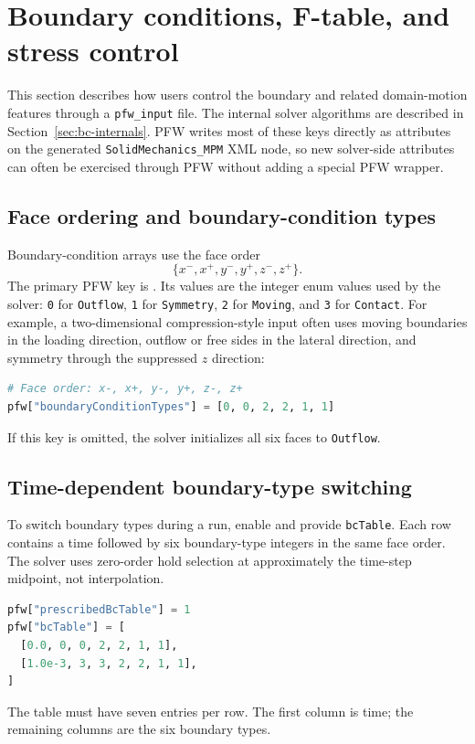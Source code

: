 \section{Boundary conditions, F-table, and stress control}
\label{sec:pfw-boundary-controls}

This section describes how users control the boundary and related domain-motion features through a \texttt{pfw\_input} file.  The internal solver algorithms are described in Section~\ref{sec:bc-internals}.  PFW writes most of these keys directly as attributes on the generated \texttt{SolidMechanics\_MPM} XML node, so new solver-side attributes can often be exercised through PFW without adding a special PFW wrapper.

\subsection{Face ordering and boundary-condition types}

Boundary-condition arrays use the face order
\begin{equation}
  \{x^-,x^+,y^-,y^+,z^-,z^+\}.
\end{equation}
The primary PFW key is .  Its values are the integer enum values used by the solver: \texttt{0} for \texttt{Outflow}, \texttt{1} for \texttt{Symmetry}, \texttt{2} for \texttt{Moving}, and \texttt{3} for \texttt{Contact}.  For example, a two-dimensional compression-style input often uses moving boundaries in the loading direction, outflow or free sides in the lateral direction, and symmetry through the suppressed $z$ direction:
\begin{lstlisting}[language=Python,caption={PFW boundary face order and type selection.}]
# Face order: x-, x+, y-, y+, z-, z+
pfw["boundaryConditionTypes"] = [0, 0, 2, 2, 1, 1]
\end{lstlisting}
If this key is omitted, the solver initializes all six faces to \texttt{Outflow}.

\subsection{Time-dependent boundary-type switching}

To switch boundary types during a run, enable  and provide \texttt{bcTable}.  Each row contains a time followed by six boundary-type integers in the same face order.  The solver uses zero-order hold selection at approximately the time-step midpoint, not interpolation.
\begin{lstlisting}[language=Python,caption={PFW boundary-condition table.}]
pfw["prescribedBcTable"] = 1
pfw["bcTable"] = [
  [0.0, 0, 0, 2, 2, 1, 1],
  [1.0e-3, 3, 3, 2, 2, 1, 1],
]
\end{lstlisting}
The table must have seven entries per row.  The first column is time; the remaining columns are the six boundary types.

